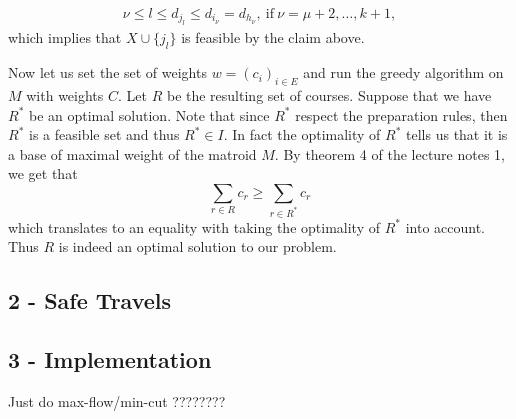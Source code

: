 \documentclass{article}
\begin{document}
\begin{flushleft}
\begin{enumerate}
\begin{gather*}
              \nu\leq l\leq d_{j_l}\leq d_{i_{\nu}}=d_{h_{\nu}},\ \mathrm{if}\ \nu=\mu+2,\ldots,k+1,
          \end{gather*}
          which implies that $X\cup\{j_l\}$ is feasible by the claim above.
\end{enumerate}
Now let us set the set of weights $w=(c_i)_{i\in E}$ and run the greedy algorithm on $M$ with weights $C$.
Let $R$ be the resulting set of courses. Suppose that we have $R^*$ be an optimal solution.
Note that since $R^*$ respect the preparation rules, then $R^*$ is a feasible set and thus $R^*\in I$.
In fact the optimality of $R^*$ tells us that it is a base of maximal weight of the matroid $M$.
By theorem 4 of the lecture notes 1, we get that 
\begin{equation*}
    \sum_{r\in R}c_r\geq\sum_{r\in R^*}c_r
\end{equation*}
which translates to an equality with taking the optimality of $R^*$ into account. Thus $R$ is indeed an optimal solution to our problem.

\subsection*{2 - Safe Travels}

\newpage

\subsection{3 - Implementation}

Just do max-flow/min-cut ???????? 

\end{flushleft}
\end{document}
